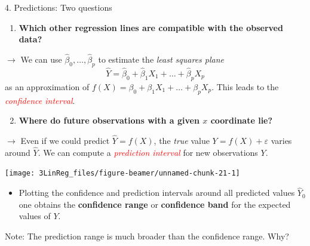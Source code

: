 \documentclass[
  10pt,
  ignorenonframetext,
]{beamer}
\providecommand{\tightlist}{%
  \setlength{\itemsep}{0pt}\setlength{\parskip}{0pt}}
\begin{document}
\begin{frame}
\begin{block}{4. Predictions: Two questions}
\protect\hypertarget{predictions-two-questions}{}
\(~\)

\begin{enumerate}
\tightlist
\item
  \textbf{Which other regression lines are compatible with the observed
  data?}
\end{enumerate}

\vspace{2mm}

\(\rightarrow\) We can use \(\hat\beta_0, \ldots , \hat\beta_p\) to
estimate the \emph{least squares plane}
\[\hat{Y} = \hat\beta_0 + \hat\beta_1 X_1 + \ldots + \hat\beta_p X_p \]
as an approximation of
\(f(X) = \beta_0 + \beta_1 X_1 + \ldots + \beta_p X_p .\) This leads to
the \emph{\textcolor{red}{confidence interval}}.

\vspace{4mm}

\begin{enumerate}
\setcounter{enumi}{1}
\tightlist
\item
  \textbf{Where do future observations with a given \(x\) coordinate
  lie?}
\end{enumerate}

\vspace{2mm}

\(\rightarrow\) Even if we could predict \(\hat{Y}=f(X)\), the
\emph{true} value \(Y = f(X) + \varepsilon\) varies around \(\hat{Y}\).
We can compute a \emph{\textcolor{red}{prediction interval}} for new
observations \(Y\).
\end{block}
\end{frame}

\begin{frame}
\begin{center}\texttt{[image: 3LinReg\_files/figure-beamer/unnamed-chunk-21-1]} \end{center}

\begin{itemize}
\tightlist
\item
  Plotting the confidence and prediction intervals around all predicted
  values \(\hat Y_0\) one obtains the \textbf{confidence range} or
  \textbf{confidence band} for the expected values of \(Y\).
\end{itemize}

\vspace{2mm}

Note: The prediction range is much broader than the confidence range.
Why?
\end{frame}
\end{document}
